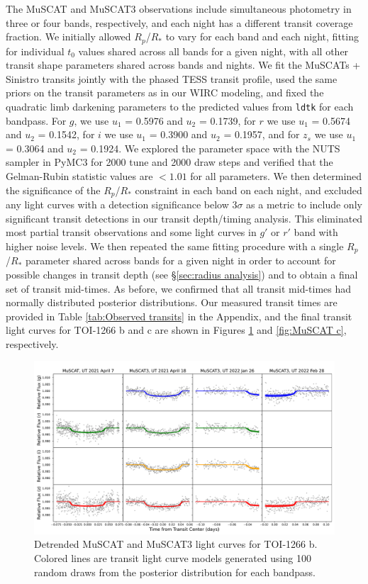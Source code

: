 \documentclass[twocolumn]{aastex631}
\begin{document}
The MuSCAT and MuSCAT3 observations include simultaneous photometry in three or four bands, respectively, and each night has a different transit coverage fraction. We initially allowed $R_p$/$R_*$ to vary for each band and each night, fitting for individual $t_0$ values shared across all bands for a given night, with all other transit shape parameters shared across bands and nights. We fit the MuSCATs + Sinistro transits jointly with the phased TESS transit profile, used the same priors on the transit parameters as in our WIRC modeling, and fixed the quadratic limb darkening parameters to the predicted values from \texttt{ldtk} for each bandpass. For $g$, we use $u_1$ = 0.5976 and $u_2$ = 0.1739, for $r$ we use $u_1$ = 0.5674 and $u_2$ = 0.1542, for $i$ we use $u_1$ = 0.3900 and $u_2$ = 0.1957, and for $z_s$ we use $u_1$ = 0.3064 and $u_2$ = 0.1924. We explored the parameter space with the NUTS sampler in PyMC3 for 2000 tune and 2000 draw steps and verified that the Gelman-Rubin statistic values are $<1.01$ for all parameters. We then determined the significance of the $R_p$/$R_*$ constraint in each band on each night, and excluded any light curves with a detection significance below 3$\sigma$ as a metric to include only significant transit detections in our transit depth/timing analysis. This eliminated most partial transit observations and some light curves in $g'$ or $r'$ band with higher noise levels. We then repeated the same fitting procedure with a single $R_p$/$R_*$ parameter shared across bands for a given night in order to account for possible changes in transit depth (see \S\ref{sec:radius analysis}) and to obtain a final set of transit mid-times. As before, we confirmed that all transit mid-times had normally distributed posterior distributions. Our measured transit times are provided in Table \ref{tab:Observed transits} in the Appendix, and the final transit light curves for TOI-1266 b and c are shown in Figures \ref{fig:MuSCAT b} and \ref{fig:MuSCAT c}, respectively. 

\begin{figure}
\begin{center}
  \includegraphics[width=17.5cm]{1266b_MuSCAT_Mega_Joint_Detrended.pdf}
  \caption{Detrended MuSCAT and MuSCAT3 light curves for TOI-1266 b. Colored lines are transit light curve models generated using 100 random draws from the posterior distribution for each bandpass.}
  \label{fig:MuSCAT b}
\end{center}
\end{figure}
\end{document}
